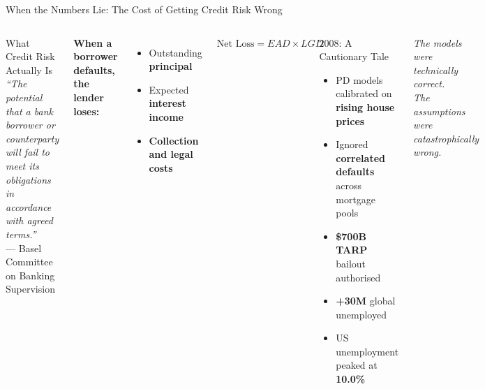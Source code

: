 \documentclass[aspectratio=169,11pt]{beamer}
\newcommand{\B}[1]{\textbf{#1}}
\begin{document}
\begin{frame}[shrink=3]{When the Numbers Lie: The Cost of Getting Credit Risk Wrong}
  \begin{columns}[T]
      \begin{block}{What Credit Risk Actually Is}
        \small\textit{``The potential that a bank borrower or counterparty will fail to meet its obligations in accordance with agreed terms.''}\\[2pt]
        \hfill --- Basel Committee on Banking Supervision
      \end{block}
      \vspace{4pt}
      \small\textbf{When a borrower defaults, the lender loses:}
      \begin{itemize}\small
        \item Outstanding \B{principal}
        \item Expected \B{interest income}
        \item \B{Collection and legal costs}
      \end{itemize}
      \vspace{4pt}
      $\text{Net Loss} = EAD \times LGD$

      \begin{alertblock}{2008: A Cautionary Tale}
        \begin{itemize}\small
          \item PD models calibrated on \B{rising house prices}
          \item Ignored \B{correlated defaults} across mortgage pools
          \item \B{\$700B TARP} bailout authorised
          \item \B{+30M} global unemployed
          \item US unemployment peaked at \B{10.0\%}
        \end{itemize}
      \end{alertblock}
      \vspace{4pt}
      \centering\small\textit{The models were technically correct.\\ The assumptions were catastrophically wrong.}
  \end{columns}
\end{frame}
\end{document}
